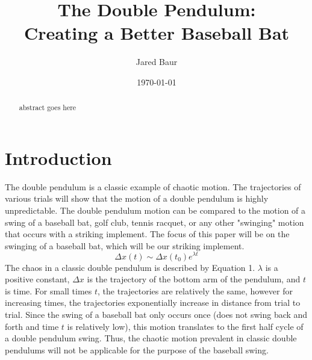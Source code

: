 \documentclass[%
 aip,
 amsmath,amssymb,
 reprint,%
 floatfix,%
]{revtex4-1}
\begin{document}

\title[]{The Double Pendulum:\\Creating a Better Baseball Bat}

\author{Jared Baur}

\date{\today}%

\begin{abstract}
	abstract goes here
\end{abstract}

\maketitle

\section{\label{sec:level1}Introduction}
The double pendulum is a classic example of chaotic motion. The trajectories of various trials will show that the motion of a double pendulum is highly unpredictable. The double pendulum motion can be compared to the motion of a swing of a baseball bat, golf club, tennis racquet, or any other "swinging" motion that occurs with a striking implement. The focus of this paper will be on the swinging of a baseball bat, which will be our striking implement.\\

\begin{equation}
	\Delta x(t) \sim \Delta x(t_0) e^{\lambda t}
\end{equation}
\indent The chaos in a classic double pendulum is described by Equation 1. $\lambda$ is a positive constant, $\Delta x$ is the trajectory of the bottom arm of the pendulum, and $t$ is time. For small times $t$, the trajectories are relatively the same, however for increasing times, the trajectories exponentially increase in distance from trial to trial. Since the swing of a baseball bat only occurs once (does not swing back and forth and time $t$ is relatively low), this motion translates to the first half cycle of a double pendulum swing. Thus, the chaotic motion prevalent in classic double pendulums will not be applicable for the purpose of the baseball swing.\\
\end{document}
